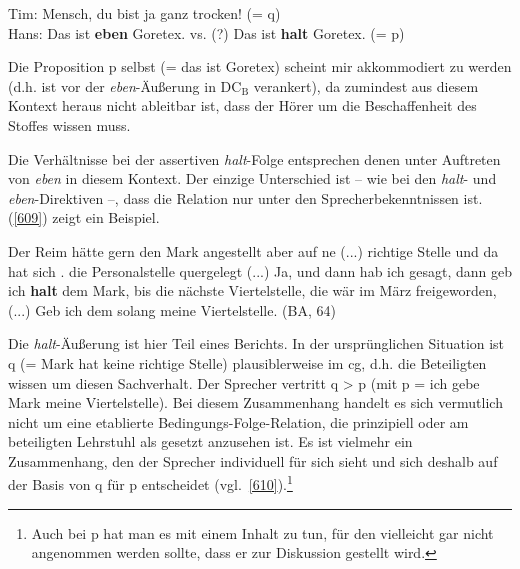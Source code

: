 \begin{exe}
	\ex\label{608} 
		Tim: Mensch, du bist ja ganz trocken! (= q)\\
		Hans: Das ist \textbf{eben} Goretex. vs. (?) Das ist \textbf{halt} Goretex. (= p)
		\newline
		\hbox{}\hfill\hbox{\citet[125]{Thurmair1989}}	
\end{exe}
Die Proposition p selbst (= das ist Goretex) scheint mir akkommodiert  zu werden (d.h. ist vor der \textit{eben}-Äußerung in DC$_{\textrm{B}}$ verankert), da zumindest aus diesem Kontext heraus nicht ableitbar ist, dass der Hörer um die Beschaffenheit des Stoffes wissen muss.

Die Verhältnisse bei der assertiven \textit{halt}-Folge entsprechen denen unter Auftre\-ten von \textit{eben} in diesem Kontext. Der einzige Unterschied ist – wie bei den \textit{halt}- und \textit{eben}-Direktiven –, dass die Relation nur unter den Sprecherbekenntnissen ist. (\ref{609}) zeigt ein Beispiel.

\begin{exe}
	\ex\label{609} 

	Der Reim hätte gern den Mark angestellt aber auf ne (...) richtige Stelle und da hat sich . die Personalstelle 						quergelegt (...) Ja, und dann hab ich gesagt, dann geb ich \textbf{halt} dem Mark, bis die nächste Viertelstelle, die 				wär im 	März freigeworden, (...) Geb ich dem solang meine Viertelstelle. (BA, 64)
	\newline
	\hbox{}\hfill\hbox{\citet[125]{Thurmair1989}}
\end{exe}
Die \textit{halt}-Äußerung ist hier Teil eines Berichts. In der ursprünglichen Situation ist q (= Mark hat keine richtige Stelle) plausiblerweise im cg, d.h. die Beteiligten wissen um diesen Sachverhalt. Der Sprecher vertritt q > p (mit p = ich gebe Mark meine Viertelstelle). Bei diesem Zusammenhang handelt es sich vermutlich nicht um eine etablierte Bedingungs-Folge-Relation, die prinzipiell oder am beteiligten Lehrstuhl als gesetzt anzusehen ist. Es ist vielmehr ein Zusammenhang, den der Sprecher individuell für sich sieht und sich deshalb auf der Basis von q für p entscheidet (vgl.\ \ref{610}).\footnote{Auch bei p hat man es mit einem Inhalt zu tun, für den vielleicht gar nicht angenommen werden sollte, dass er zur Diskussion gestellt wird.}

